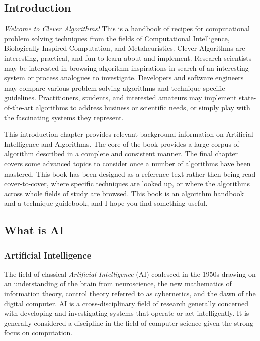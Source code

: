 

\begin{bibunit}
\chapter{Introduction}
\label{chap:intro}
\emph{Welcome to Clever Algorithms!} This is a handbook of recipes for computational problem solving techniques from the fields of Computational Intelligence, Biologically Inspired Computation, and Metaheuristics. 
Clever Algorithms are interesting, practical, and fun to learn about and implement.
Research scientists may be interested in browsing algorithm inspirations in search of an interesting system or process analogues to investigate. Developers and software engineers may compare various problem solving algorithms and technique-specific guidelines. Practitioners, students, and interested amateurs may implement state-of-the-art algorithms to address business or scientific needs, or simply play with the fascinating systems they represent.

This introduction chapter provides relevant background information on Artificial Intelligence and Algorithms. The core of the book provides a large corpus of algorithm described in a complete and consistent manner. The final chapter covers some advanced topics to consider once a number of algorithms have been mastered. This book has been designed as a reference text rather then being read cover-to-cover, where specific techniques are looked up, or where the algorithms across whole fields of study are browsed. This book is an algorithm handbook and a technique guidebook, and I hope you find something useful.


% 
% 
\section{What is AI}
\label{intro:sec:what_is_ai}
% 
% 
\subsection{Artificial Intelligence}
\label{sec:artificial_intelligence}
The field of classical \emph{Artificial Intelligence} (AI) coalesced in the 1950s drawing on an understanding of the brain from neuroscience, the new mathematics of information theory, control theory referred to as cybernetics, and the dawn of the digital computer. AI is a cross-disciplinary field of research generally concerned with developing and investigating systems that operate or act intelligently. It is generally considered a discipline in the field of computer science given the strong focus on computation.


\end{bibunit}
